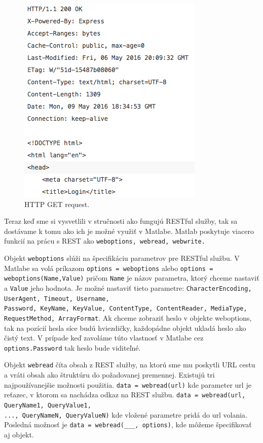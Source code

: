 \begin{figure}[H]
  \centering
  \includegraphics[scale=0.7]{img/rest/get-request.png}
  \caption{HTTP GET request.}
  \label{get-http}
\end{figure}

Teraz keď sme si vysvetlili v stručnosti ako fungujú RESTful služby, tak sa dostávame k tomu ako ich je možné využiť v Matlabe. Matlab poskytuje viacero funkcií na prácu s REST ako \verb|weboptions, webread, webwrite.|

Objekt \verb|weboptions| slúži na špecifikáciu parametrov pre RESTful službu. V Matlabe sa volá príkazom \verb|options = weboptions| alebo \verb|options = weboptions(Name,Value)| pričom \verb|Name| je názov parametra, ktorý chceme nastaviť a \verb|Value| jeho hodnota. Je možné nastaviť tieto parametre: \verb|CharacterEncoding, UserAgent, Timeout, Username,| \\ \verb|Password, KeyName, KeyValue, ContentType, ContentReader, MediaType,| \\ \verb|RequestMethod, ArrayFormat|. Ak chceme zobraziť heslo v objekte weboptions, tak na pozícií hesla síce budú hviezdičky, každopádne objekt ukladá heslo ako čistý text. V prípade keď zavoláme túto vlastnosť v Matlabe cez \verb|options.Password| tak heslo bude viditeľné.\cite{matlab-weboptions}

Objekt \verb|webread| číta obsah z REST služby, na ktorú sme mu poskytli URL cestu a vráti obsah ako štruktúru do požadovanej premennej. Existujú tri najpoužívanejšie možnosti použitia. \verb|data = webread(url)| kde parameter url je reťazec, v ktorom sa nachádza odkaz na REST službu. \verb|data = webread(url, QueryName1, QueryValue1,| \\ \verb|..., QueryNameN, QueryValueN)| kde vložené parametre pridá do url volania. Posledná možnosť je \verb|data = webread(___, options)|, kde môžeme špecifikovať aj  objekt.\cite{matlab-webread}

